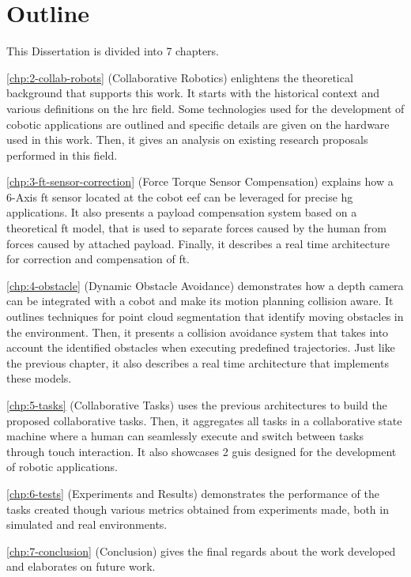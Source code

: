 \section{Outline}

\par This Dissertation is divided into 7 chapters.
\par \autoref{chp:2-collab-robots} (Collaborative Robotics) enlightens the theoretical background that supports this work. It starts with the historical context and various definitions on the \ac{hrc} field. Some technologies used for the development of cobotic applications are outlined and specific details are given on the hardware used in this work. Then, it gives an analysis on existing research proposals performed in this field.

\par \autoref{chp:3-ft-sensor-correction} (Force Torque Sensor Compensation) explains how a 6-Axis \ac{ft} sensor located at the cobot \ac{eef} can be leveraged for precise \ac{hg} applications. It also presents a payload compensation system based on a theoretical \ac{ft} model, that is used to separate forces caused by the human from forces caused by attached payload. Finally, it describes a real time architecture for correction and compensation of \ac{ft}.

\par \autoref{chp:4-obstacle} (Dynamic Obstacle Avoidance) demonstrates how a depth camera can be integrated with a cobot and make its motion planning collision aware. It outlines techniques for point cloud segmentation that identify moving obstacles in the environment. Then, it presents a collision avoidance system that takes into account the identified obstacles when executing predefined trajectories. Just like the previous chapter, it also describes a real time architecture that implements these models.

\par \autoref{chp:5-tasks} (Collaborative Tasks) uses the previous architectures to build the proposed collaborative tasks. Then, it aggregates all tasks in a collaborative state machine where a human can seamlessly execute and switch between tasks through touch interaction. It also showcases 2 \acp{gui} designed for the development of robotic applications.

\par \autoref{chp:6-tests} (Experiments and Results) demonstrates the performance of the tasks created though various metrics obtained from experiments made, both in simulated and real environments.

\par \autoref{chp:7-conclusion} (Conclusion) gives the final regards about the work developed and elaborates on future work.
